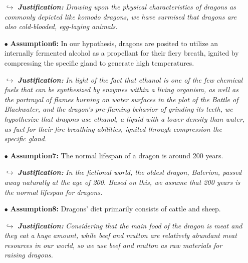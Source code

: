 \documentclass[12pt]{article}  %
\begin{document}
\begin{itemize}
\vspace{-0.2cm}
\item[$\hookrightarrow $]\textit{\textbf{Justification:}} \textit{Drawing upon the physical characteristics of dragons as commonly depicted like komodo dragons, we have surmised that dragons are also cold-blooded, egg-laying animals.}

\item[$\bullet$] \textbf{Assumption6:} In our hypothesis, dragons are posited to utilize an internally fermented alcohol as a propellant for their fiery breath, ignited by compressing the specific gland to generate high temperatures.

\vspace{-0.2cm}
\item[$\hookrightarrow $]\textit{\textbf{Justification:}} \textit{In light of the fact that ethanol is one of the few chemical fuels that can be synthesized by enzymes within a living organism, as well as the portrayal of flames burning on water surfaces in the plot of the Battle of Blackwater, and the dragon's pre-flaming behavior of grinding its teeth, we hypothesize that dragons use ethanol, a liquid with a lower density than water, as fuel for their fire-breathing abilities, ignited through compression the specific gland.}

\item[$\bullet$] \textbf{Assumption7:} The normal lifespan of a dragon is around 200 years.

\vspace{-0.2cm}
\item[$\hookrightarrow $]\textit{\textbf{Justification:}} \textit{In the fictional world, the oldest dragon, Balerion, passed away naturally at the age of 200. Based on this, we assume that 200 years is the normal lifespan for dragons.}

\item[$\bullet$] \textbf{Assumption8:} Dragons' diet primarily consists of cattle and sheep.

\vspace{-0.2cm}
\item[$\hookrightarrow $]\textit{\textbf{Justification:}} \textit{Considering that the main food of the dragon is meat and they eat a huge amount, while beef and mutton are relatively abundant meat resources in our world, so we use beef and mutton as raw materials for raising dragons.}

\end{itemize}
\end{document}
